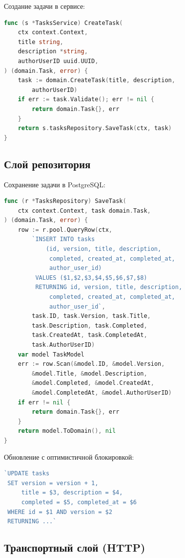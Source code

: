 \documentclass[a4paper,14pt]{extarticle}
\begin{document}
Создание задачи в сервисе:

\begin{lstlisting}[language=Go]
func (s *TasksService) CreateTask(
    ctx context.Context,
    title string,
    description *string,
    authorUserID uuid.UUID,
) (domain.Task, error) {
    task := domain.CreateTask(title, description,
        authorUserID)
    if err := task.Validate(); err != nil {
        return domain.Task{}, err
    }
    return s.tasksRepository.SaveTask(ctx, task)
}
\end{lstlisting}

\subsection{Слой репозитория}

Сохранение задачи в PostgreSQL:

\begin{lstlisting}[language=Go]
func (r *TasksRepository) SaveTask(
    ctx context.Context, task domain.Task,
) (domain.Task, error) {
    row := r.pool.QueryRow(ctx,
        `INSERT INTO tasks
            (id, version, title, description,
             completed, created_at, completed_at,
             author_user_id)
         VALUES ($1,$2,$3,$4,$5,$6,$7,$8)
         RETURNING id, version, title, description,
             completed, created_at, completed_at,
             author_user_id`,
        task.ID, task.Version, task.Title,
        task.Description, task.Completed,
        task.CreatedAt, task.CompletedAt,
        task.AuthorUserID)
    var model TaskModel
    err := row.Scan(&model.ID, &model.Version,
        &model.Title, &model.Description,
        &model.Completed, &model.CreatedAt,
        &model.CompletedAt, &model.AuthorUserID)
    if err != nil {
        return domain.Task{}, err
    }
    return model.ToDomain(), nil
}
\end{lstlisting}

Обновление с оптимистичной блокировкой:

\begin{lstlisting}[language=Go]
`UPDATE tasks
 SET version = version + 1,
     title = $3, description = $4,
     completed = $5, completed_at = $6
 WHERE id = $1 AND version = $2
 RETURNING ...`
\end{lstlisting}

\subsection{Транспортный слой (HTTP)}
\end{document}
